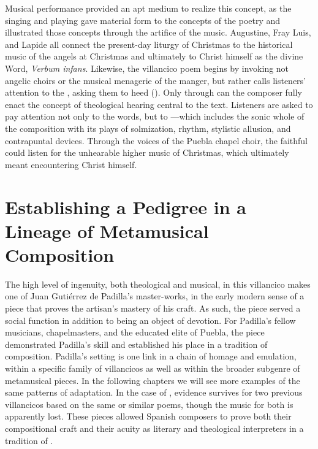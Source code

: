 Musical performance provided an apt medium to realize this concept, as the
singing and playing gave material form to the concepts of the poetry and
illustrated those concepts through the artifice of the music.
Augustine, Fray Luis, and Lapide all connect the present-day liturgy of
Christmas to the historical music of the angels at Christmas and ultimately to
Christ himself as the divine Word, \emph{Verbum infans}.
Likewise, the villancico poem begins by invoking not angelic choirs or the
musical menagerie of the manger, but rather calls listeners' attention to the
, asking them to heed 
().
Only through  can the composer fully enact
the concept of theological hearing central to the text.
Listeners are asked to pay attention not only to the words, but to ---which includes the sonic whole of the composition with its plays of
solmization, rhythm, stylistic allusion, and contrapuntal devices.
Through the voices of the Puebla chapel choir, the faithful could listen for the
unhearable higher music of Christmas, which ultimately meant encountering Christ
himself.

\section
[Establishing a Pedigree]
{Establishing a Pedigree in a Lineage of Metamusical Composition}

The high level of ingenuity, both theological and musical, in this villancico
makes  one of Juan Gutiérrez de Padilla's
master-works, in the early modern sense of a piece that proves the artisan's
mastery of his craft.
As such, the piece served a social function in addition to being an object of
devotion.
For Padilla's fellow musicians, chapelmasters, and the educated elite of Puebla,
the piece demonstrated Padilla's skill and established his place in a tradition
of composition.
Padilla's setting is one link in a chain of homage and emulation, within a
specific family of villancicos as well as within the broader subgenre of
metamusical pieces.
In the following chapters we will see more examples of the same patterns of
adaptation.
In the case of , evidence survives for two
previous villancicos based on the same or similar poems, though the music for
both is apparently lost.
These pieces allowed Spanish composers to prove both their compositional craft
and their acuity as literary and theological interpreters in a tradition of
.

